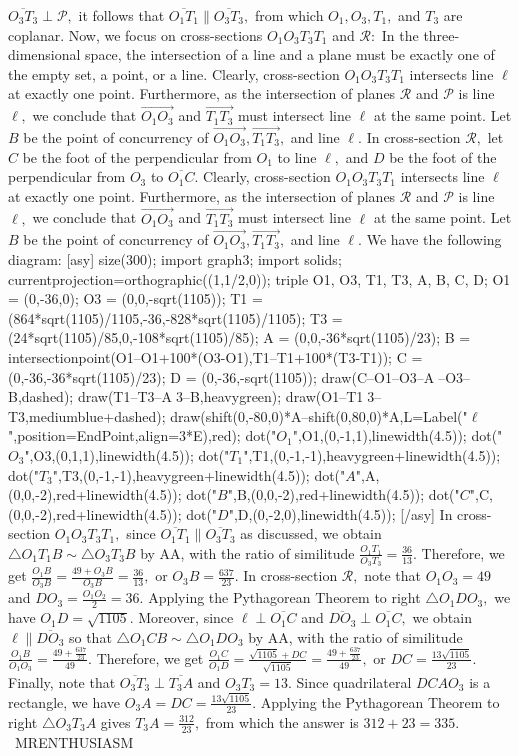 \documentclass[12pt]{article}
\begin{document}
$\overline{O_3T_3}\perp\mathcal{P},$ it follows that $\overline{O_1T_1}\parallel\overline{O_3T_3},$ from which $O_1,O_3,T_1,$ and $T_3$ are coplanar. Now, we focus on cross-sections $O_1O_3T_3T_1$ and $\mathcal{R}:$ In the three-dimensional space, the intersection of a line and a plane must be exactly one of the empty set, a point, or a line. Clearly, cross-section $O_1O_3T_3T_1$ intersects line $\ell$ at exactly one point. Furthermore, as the intersection of planes $\mathcal{R}$ and $\mathcal{P}$ is line $\ell,$ we conclude that $\overrightarrow{O_1O_3}$ and $\overrightarrow{T_1T_3}$ must intersect line $\ell$ at the same point. Let $B$ be the point of concurrency of $\overrightarrow{O_1O_3},\overrightarrow{T_1T_3},$ and line $\ell.$ In cross-section $\mathcal{R},$ let $C$ be the foot of the perpendicular from $O_1$ to line $\ell,$ and $D$ be the foot of the perpendicular from $O_3$ to $\overline{O_1C}.$ Clearly, cross-section $O_1O_3T_3T_1$ intersects line $\ell$ at exactly one point. Furthermore, as the intersection of planes $\mathcal{R}$ and $\mathcal{P}$ is line $\ell,$ we conclude that $\overrightarrow{O_1O_3}$ and $\overrightarrow{T_1T_3}$ must intersect line $\ell$ at the same point. Let $B$ be the point of concurrency of $\overrightarrow{O_1O_3},\overrightarrow{T_1T_3},$ and line $\ell.$ We have the following diagram: [asy] size(300); import graph3; import solids; currentprojection=orthographic((1,1/2,0)); triple O1, O3, T1, T3, A, B, C, D; O1 = (0,-36,0); O3 = (0,0,-sqrt(1105)); T1 = (864*sqrt(1105)/1105,-36,-828*sqrt(1105)/1105); T3 = (24*sqrt(1105)/85,0,-108*sqrt(1105)/85); A = (0,0,-36*sqrt(1105)/23); B = intersectionpoint(O1--O1+100*(O3-O1),T1--T1+100*(T3-T1)); C = (0,-36,-36*sqrt(1105)/23); D = (0,-36,-sqrt(1105)); draw(C--O1--O3--A^^D--O3--B,dashed); draw(T1--T3--A^^T3--B,heavygreen); draw(O1--T1^^O3--T3,mediumblue+dashed); draw(shift(0,-80,0)*A--shift(0,80,0)*A,L=Label("$\ell$",position=EndPoint,align=3*E),red); dot("$O_1$",O1,(0,-1,1),linewidth(4.5)); dot("$O_3$",O3,(0,1,1),linewidth(4.5)); dot("$T_1$",T1,(0,-1,-1),heavygreen+linewidth(4.5)); dot("$T_3$",T3,(0,-1,-1),heavygreen+linewidth(4.5)); dot("$A$",A,(0,0,-2),red+linewidth(4.5)); dot("$B$",B,(0,0,-2),red+linewidth(4.5)); dot("$C$",C,(0,0,-2),red+linewidth(4.5)); dot("$D$",D,(0,-2,0),linewidth(4.5)); [/asy] In cross-section $O_1O_3T_3T_1,$ since $\overline{O_1T_1}\parallel\overline{O_3T_3}$ as discussed, we obtain $\triangle O_1T_1B\sim\triangle O_3T_3B$ by AA, with the ratio of similitude $\frac{O_1T_1}{O_3T_3}=\frac{36}{13}.$ Therefore, we get $\frac{O_1B}{O_3B}=\frac{49+O_3B}{O_3B}=\frac{36}{13},$ or $O_3B=\frac{637}{23}.$ In cross-section $\mathcal{R},$ note that $O_1O_3=49$ and $DO_3=\frac{O_1O_2}{2}=36.$ Applying the Pythagorean Theorem to right $\triangle O_1DO_3,$ we have $O_1D=\sqrt{1105}.$ Moreover, since $\ell\perp\overline{O_1C}$ and $\overline{DO_3}\perp\overline{O_1C},$ we obtain $\ell\parallel\overline{DO_3}$ so that $\triangle O_1CB\sim\triangle O_1DO_3$ by AA, with the ratio of similitude $\frac{O_1B}{O_1O_3}=\frac{49+\frac{637}{23}}{49}.$ Therefore, we get $\frac{O_1C}{O_1D}=\frac{\sqrt{1105}+DC}{\sqrt{1105}}=\frac{49+\frac{637}{23}}{49},$ or $DC=\frac{13\sqrt{1105}}{23}.$ Finally, note that $\overline{O_3T_3}\perp\overline{T_3A}$ and $O_3T_3=13.$ Since quadrilateral $DCAO_3$ is a rectangle, we have $O_3A=DC=\frac{13\sqrt{1105}}{23}.$ Applying the Pythagorean Theorem to right $\triangle O_3T_3A$ gives $T_3A=\frac{312}{23},$ from which the answer is $312+23=\boxed{335}.$ ~MRENTHUSIASM
\end{document}
